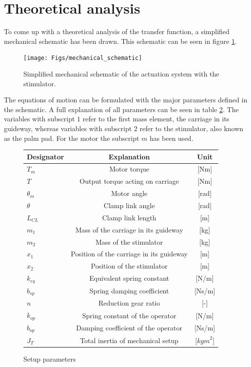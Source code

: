 	\section{Theoretical analysis}
	To come up with a theoretical analysis of the transfer function, a simplified mechanical schematic has been drawn. This schematic can be seen in figure \ref{fig:mechanical_schematic}.
	\begin{figure}[h!]
		\centering
		\texttt{[image: Figs/mechanical\_schematic]}
		\caption{Simplified mechanical schematic of the actuation system with the stimulator.}
		\label{fig:mechanical_schematic}
	\end{figure}
	The equations of motion can be formulated with the major parameters defined in the schematic. A full explanation of all parameters can be seen in table \ref{tab:setup_params}. The variables with subscript $1$ refer to the first mass element, the carriage in its guideway, whereas variables with subscript $2$ refer to the stimulator, also known as the palm pad. For the motor the subscript $m$ has been used.
	
	\begin{figure}[h!]
		\centering
		\begin{tabular}{|l|c|c|}%
			\hline
			 Designator & Explanation & Unit \\ \hline \hline
			$T_m$ & Motor torque & [Nm]\\ 
			$T$ & Output torque acting on carriage& [Nm]\\
			$\theta_m$ & Motor angle & [rad]\\
			$\theta$ & Clamp link angle & [rad]\\  
			$L_{CL}$ & Clamp link length & [m]\\
			$m_{1}$ & Mass of the carriage in its guideway & [kg]\\
			$m_{2}$ & Mass of the stimulator & [kg]\\
			$x_{1}$ & Position of the carriage in its guideway & [m]\\
			$x_{2}$ & Position of the stimulator & [m]\\
			$k_{eq}$ & Equivalent spring constant & [N/m]\\
			$b_{sp}$ & Spring damping coefficient & [Ns/m]\\
			$n$ & Reduction gear ratio & [-]\\
			$k_{op}$ & Spring constant of the operator & [N/m]\\
			$b_{op}$ & Damping coefficient of the operator & [Ns/m]\\
			$J_T$ & Total inertia of mechanical setup & [$\textit{kgm}^2$]\\
			\hline
		\end{tabular}
		\caption{Setup parameters}
		\label{tab:setup_params}
	\end{figure}
	
